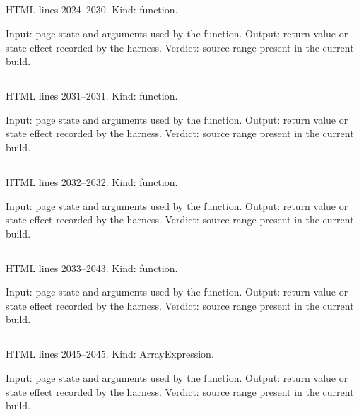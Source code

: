 \subsection*{\texttt{}}
\label{vf_5_showCuteToast}
HTML lines 2024--2030. Kind: function.

Input: page state and arguments used by the function.
Output: return value or state effect recorded by the harness.
Verdict: source range present in the current build.

\subsection*{\texttt{}}
\label{vf_6_languageStorageKey}
HTML lines 2031--2031. Kind: function.

Input: page state and arguments used by the function.
Output: return value or state effect recorded by the harness.
Verdict: source range present in the current build.

\subsection*{\texttt{}}
\label{vf_7_rememberedLanguage}
HTML lines 2032--2032. Kind: function.

Input: page state and arguments used by the function.
Output: return value or state effect recorded by the harness.
Verdict: source range present in the current build.

\subsection*{\texttt{}}
\label{vf_8_setLanguage}
HTML lines 2033--2043. Kind: function.

Input: page state and arguments used by the function.
Output: return value or state effect recorded by the harness.
Verdict: source range present in the current build.

\subsection*{\texttt{}}
\label{vf_9_ROLES}
HTML lines 2045--2045. Kind: ArrayExpression.

Input: page state and arguments used by the function.
Output: return value or state effect recorded by the harness.
Verdict: source range present in the current build.

